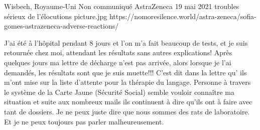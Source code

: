           {Wisbech, Royaume-Uni}
          {Non communiqué}
          {AstraZeneca}
          {19 mai 2021}
          {troubles sérieux de l'élocutions}
          {picture.jpg}
          {https://nomoresilence.world/astra-zeneca/sofia-gomes-astrazeneca-adverse-reactions/}
          {

J’ai été à l’hôpital pendant 8 jours et l’on m’a fait beaucoup de tests, et je
suis retournée chez moi, attendant les résultats sans autres explications! Après
quelques jours ma lettre de décharge n’est pas arrivée, alors lorsque je l’ai
demandés, les résultats sont que je suis muette!!! C’est dit dans la lettre qu’
ils m’ont mise sur la liste d’attente pour la thérapie du langage. Personne à
travers le système de la Carte Jaune (Sécurité Social) semble vouloir connaître
ma situation et suite aux nombreux mails ils continuent à dire qu’ils ont à
faire avec tant de dossiers. Je ne peux juste dire que nous sommes des rats de
laboratoire. Et je ne peux toujours pas parler malheureusement.

}
